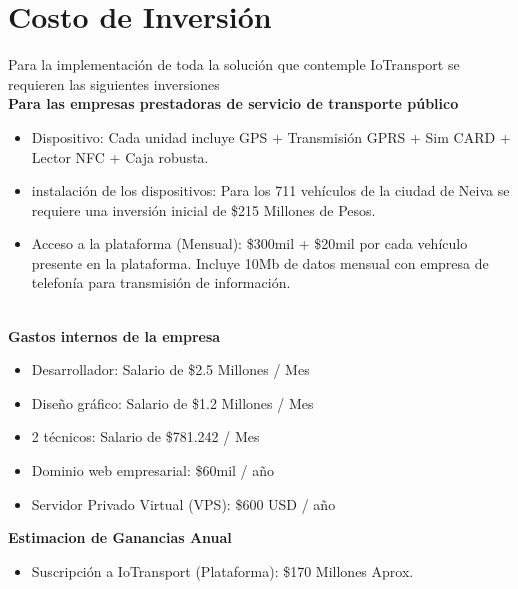 \documentclass[letterpaper]{twentysecondcv} %
\begin{document}
\section{Costo de Inversión}

\begin{twenty}
    \twentyitem
    {}
    {}
    {}
    {}
    {}
    {Para la implementación de toda la solución que contemple IoTransport se requieren las siguientes inversiones \\
    
    \textbf{Para las empresas prestadoras de servicio de transporte público} \\
    \begin{itemize}
        \item Dispositivo: Cada unidad incluye GPS + Transmisión GPRS + Sim CARD + Lector NFC + Caja robusta. \\
        \item instalación de los dispositivos: Para los 711 vehículos de la ciudad de Neiva se requiere una inversión inicial de \$215 Millones de Pesos. \\
        \item Acceso a la plataforma (Mensual): \$300mil + \$20mil por cada vehículo presente en la plataforma. Incluye 10Mb de datos mensual con empresa de telefonía para transmisión de información. \\ \\
    \end{itemize}
    
    \textbf{Gastos internos de la empresa} \\
    \begin{itemize}
        \item Desarrollador: Salario de \$2.5 Millones / Mes \\
        \item Diseño gráfico: Salario de \$1.2 Millones / Mes \\
        \item 2 técnicos: Salario de \$781.242 / Mes \\
        \item Dominio web empresarial: \$60mil / año \\
        \item Servidor Privado Virtual (VPS): \$600 USD / año \\
    \end{itemize}
    
    \textbf{Estimacion de Ganancias Anual} \\
    \begin{itemize}
        \item Suscripción a IoTransport (Plataforma): \$170 Millones Aprox.
    \end{itemize}
    
    }
    
 
\end{twenty}
\end{document}
